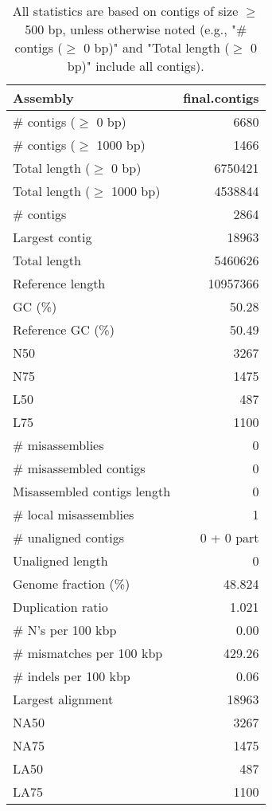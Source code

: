 \documentclass[12pt,a4paper]{article}
\begin{document}
\begin{table}[ht]
\begin{center}
\caption{All statistics are based on contigs of size $\geq$ 500 bp, unless otherwise noted (e.g., "\# contigs ($\geq$ 0 bp)" and "Total length ($\geq$ 0 bp)" include all contigs).}
\begin{tabular}{|l*{1}{|r}|}
\hline
Assembly & final.contigs \\ \hline
\# contigs ($\geq$ 0 bp) & 6680 \\ \hline
\# contigs ($\geq$ 1000 bp) & 1466 \\ \hline
Total length ($\geq$ 0 bp) & 6750421 \\ \hline
Total length ($\geq$ 1000 bp) & 4538844 \\ \hline
\# contigs & 2864 \\ \hline
Largest contig & 18963 \\ \hline
Total length & 5460626 \\ \hline
Reference length & 10957366 \\ \hline
GC (\%) & 50.28 \\ \hline
Reference GC (\%) & 50.49 \\ \hline
N50 & 3267 \\ \hline
N75 & 1475 \\ \hline
L50 & 487 \\ \hline
L75 & 1100 \\ \hline
\# misassemblies & 0 \\ \hline
\# misassembled contigs & 0 \\ \hline
Misassembled contigs length & 0 \\ \hline
\# local misassemblies & 1 \\ \hline
\# unaligned contigs & 0 + 0 part \\ \hline
Unaligned length & 0 \\ \hline
Genome fraction (\%) & 48.824 \\ \hline
Duplication ratio & 1.021 \\ \hline
\# N's per 100 kbp & 0.00 \\ \hline
\# mismatches per 100 kbp & 429.26 \\ \hline
\# indels per 100 kbp & 0.06 \\ \hline
Largest alignment & 18963 \\ \hline
NA50 & 3267 \\ \hline
NA75 & 1475 \\ \hline
LA50 & 487 \\ \hline
LA75 & 1100 \\ \hline
\end{tabular}
\end{center}
\end{table}
\end{document}
